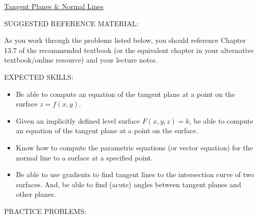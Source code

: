 \documentclass[12pt]{article}
\begin{document}
\begin{center}
\underline{\LARGE{Tangent Planes \& Normal Lines}}
\end{center}

\noindent SUGGESTED REFERENCE MATERIAL:

\bigskip

\noindent As you work through the problems listed below, you should reference Chapter 13.7 of the recommended textbook (or the equivalent chapter in your alternative textbook/online resource) and your lecture notes.

\bigskip


\noindent EXPECTED SKILLS:

\begin{itemize}

\item Be able to compute an equation of the tangent plane at a point on the surface $z=f(x,y)$. 

\item Given an implicitly defined level surface $F(x,y,z)=k$, be able to compute an equation of the tangent plane at a point on the surface. 

\item Know how to compute the parametric equations (or vector equation) for the normal line to a surface at a specified point. 

\item Be able to use gradients to find tangent lines to the intersection curve of two surfaces. And, be able to find (acute) angles between tangent planes and other planes.

\end{itemize}

\noindent PRACTICE PROBLEMS:

\medskip

\end{document}
